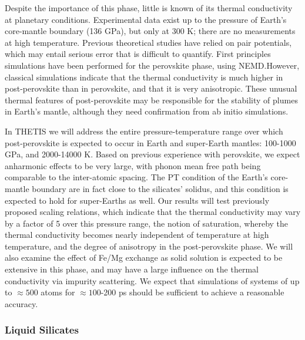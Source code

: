 Despite the importance of this phase, little is known of its thermal conductivity at planetary conditions. Experimental data exist up to the pressure of Earth’s core-mantle boundary (136 GPa), but only at 300 K;\cite{ohtaetal_12} there are no measurements at high temperature. Previous theoretical studies have relied on pair potentials,\cite{ammannetal_14} which may entail serious error that is difficult to quantify. First principles simulations have been performed for the perovskite phase, using NEMD.\cite{stackhouseetal_15}However, classical simulations indicate that the thermal conductivity
is much higher in post-perovskite than in perovskite, and that it is very anisotropic. These unusual thermal features of post-perovskite may be responsible for the stability of plumes in Earth’s mantle, although they need confirmation from ab initio simulations.

In THETIS we will address the entire pressure-temperature range over which post-perovskite is expected to occur in Earth and super-Earth mantles: 100-1000 GPa, and 2000-14000 K.\cite{stixrude_14} Based on previous experience with perovskite,\cite{stackhouseetal_15} we expect anharmonic effects to be very large, with phonon mean free path being comparable to the inter-atomic spacing. The PT condition of the Earth's core-mantle boundary are in fact close to the silicates' solidus, and this condition is expected to hold for super-Earths as well.\cite{stixrude_14} Our results will test previously proposed scaling relations, which indicate that the thermal conductivity may vary by a factor of 5 over this pressure range,\cite{tackleyetal_13} the notion of saturation, whereby the thermal conductivity becomes nearly independent of temperature at high temperature,\cite{stackhouseetal_15} and the degree of anisotropy in the post-perovskite phase.\cite{ammannetal_14} We will also examine the effect of Fe/Mg exchange as solid solution is expected to be extensive in this phase,\cite{maoetal_06b} and may have a large influence on the thermal conductivity via impurity scattering. We expect that simulations of systems of up to $\approx 500$ atoms for $\approx 100$-200 ps should be sufficient to achieve a reasonable accuracy.

\subsubsection{Liquid Silicates}

